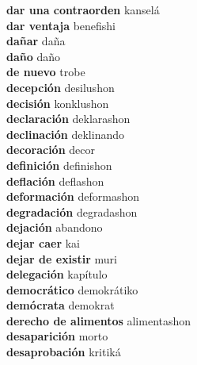 \textbf{ dar una contraorden  } kanselá \\
\textbf{ dar ventaja  } benefishi \\
\textbf{ dañar  } daña \\
\textbf{ daño  } daño \\
\textbf{ de nuevo  } trobe \\
\textbf{ decepción  } desilushon \\
\textbf{ decisión  } konklushon \\
\textbf{ declaración  } deklarashon \\
\textbf{ declinación  } deklinando \\
\textbf{ decoración  } decor \\
\textbf{ definición  } definishon \\
\textbf{ deflación  } deflashon \\
\textbf{ deformación  } deformashon \\
\textbf{ degradación  } degradashon \\
\textbf{ dejación  } abandono \\
\textbf{ dejar caer  } kai \\
\textbf{ dejar de existir  } muri \\
\textbf{ delegación  } kapítulo \\
\textbf{ democrático  } demokrátiko \\
\textbf{ demócrata  } demokrat \\
\textbf{ derecho de alimentos  } alimentashon \\
\textbf{ desaparición  } morto \\
\textbf{ desaprobación  } kritiká \\
